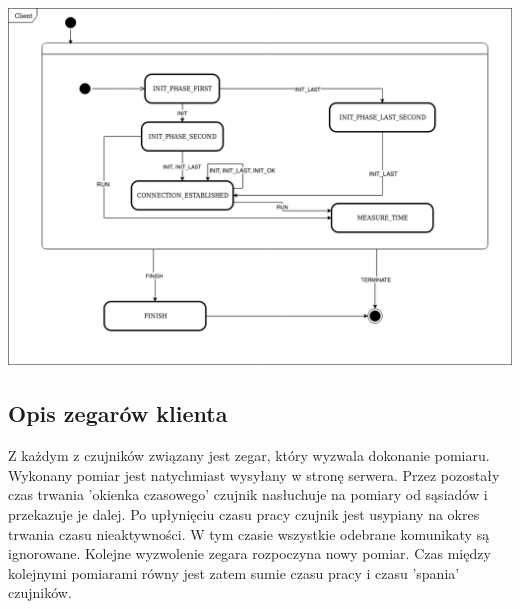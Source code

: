 \documentclass[a4paper,11pt]{article}
\begin{document}
\begin{center}
	\centerline{\includegraphics[width=1.2\textwidth]{client_states}}
\end{center}

\subsection{Opis zegarów klienta}
Z każdym z czujników związany jest zegar, który wyzwala dokonanie pomiaru. Wykonany pomiar jest natychmiast wysyłany w stronę serwera. Przez pozostały czas trwania 'okienka czasowego' czujnik nasłuchuje na pomiary od sąsiadów i przekazuje je dalej. Po upłynięciu czasu pracy czujnik jest usypiany na okres trwania czasu nieaktywności. W tym czasie wszystkie odebrane komunikaty są ignorowane. Kolejne wyzwolenie zegara rozpoczyna nowy pomiar. Czas między kolejnymi pomiarami równy jest zatem sumie czasu pracy i czasu 'spania' czujników.
\end{document}
